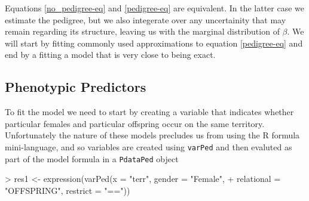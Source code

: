 \documentclass{article}
\begin{document}
Equations \ref{no_pedigree-eq} and \ref{pedigree-eq} are equivalent. In the latter case we estimate the pedigree, but we also integerate over any uncertainity that may remain regarding its structure, leaving us with the marginal distribution of $\beta$.  We will start by fitting commonly used approximations to equation \ref{pedigree-eq} and end by a fitting a model that is very close to being exact.

\subsection{Phenotypic Predictors}
\label{pred-sec}

 To fit the model we need to start by creating a variable that indicates whether particular females and particular offspring occur on the same territory.  Unfortunately the nature of these models precludes us from using the R formula mini-language,  and so variables are created using \texttt{varPed} and then evaluted as part of the model formula in a \texttt{PdataPed} object

\begin{Schunk}
\begin{Sinput}
> res1 <- expression(varPed(x = "terr", gender = "Female",
+     relational = "OFFSPRING", restrict = "=="))
\end{Sinput}
\end{Schunk}
\end{document}
